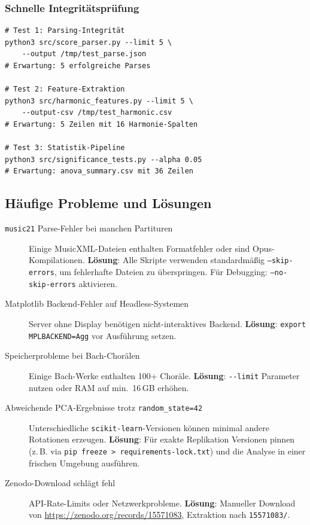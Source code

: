 \documentclass[12pt,a4paper]{article}
\theoremstyle{definition}
\begin{document}
\subsubsection{Schnelle Integritätsprüfung}

\begin{lstlisting}
# Test 1: Parsing-Integrität
python3 src/score_parser.py --limit 5 \
    --output /tmp/test_parse.json
# Erwartung: 5 erfolgreiche Parses

# Test 2: Feature-Extraktion
python3 src/harmonic_features.py --limit 5 \
    --output-csv /tmp/test_harmonic.csv
# Erwartung: 5 Zeilen mit 16 Harmonie-Spalten

# Test 3: Statistik-Pipeline
python3 src/significance_tests.py --alpha 0.05
# Erwartung: anova_summary.csv mit 36 Zeilen
\end{lstlisting}

\subsection{Häufige Probleme und Lösungen}

\begin{description}
    \item[\texttt{music21} Parse-Fehler bei manchen Partituren] Einige MusicXML-Dateien enthalten Formatfehler oder sind Opus-Kompilationen. \textbf{Lösung}: Alle Skripte verwenden standardmäßig \texttt{--skip-errors}, um fehlerhafte Dateien zu überspringen. Für Debugging: \texttt{--no-skip-errors} aktivieren.
    
    \item[Matplotlib Backend-Fehler auf Headless-Systemen] Server ohne Display benötigen nicht-interaktives Backend. \textbf{Lösung}: \texttt{export MPLBACKEND=Agg} vor Ausführung setzen.
    
    \item[Speicherprobleme bei Bach-Chorälen] Einige Bach-Werke enthalten 100+ Choräle. \textbf{Lösung}: \texttt{-{}-limit} Parameter nutzen oder RAM auf min.\ 16\,GB erhöhen.
    
    \item[Abweichende PCA-Ergebnisse trotz \texttt{random\_state=42}] Unterschiedliche \texttt{scikit-learn}-Versionen können minimal andere Rotationen erzeugen. \textbf{Lösung}: Für exakte Replikation Versionen pinnen (z.\,B. via \texttt{pip freeze > requirements-lock.txt}) und die Analyse in einer frischen Umgebung ausführen.
    
    \item[Zenodo-Download schlägt fehl] API-Rate-Limits oder Netzwerkprobleme. \textbf{Lösung}: Manueller Download von \url{https://zenodo.org/records/15571083}, Extraktion nach \texttt{15571083/}.
\end{description}
\end{document}

